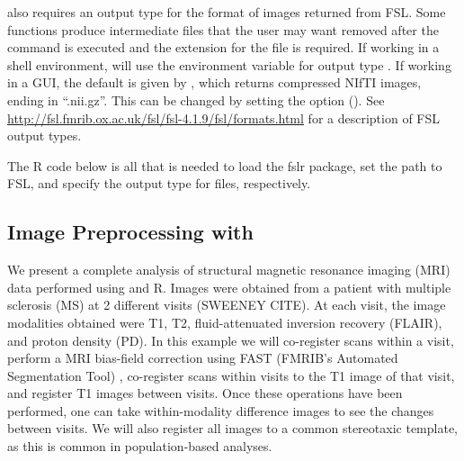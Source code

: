  also requires an output type for the format of images returned from FSL.  Some  functions produce intermediate files that the user may want removed after the command is executed and the extension for the file is required.  If working in a shell environment,  will use the environment variable for output type .  If working in a GUI, the default is given by , which returns compressed NIfTI images, ending in ``.nii.gz''.  This can be changed by setting the  option ().  See \url{http://fsl.fmrib.ox.ac.uk/fsl/fsl-4.1.9/fsl/formats.html} for a description of FSL output types.

The R code below is all that is needed to load the fslr package, set the path to FSL, and specify the output type for files, respectively.
\begin{knitrout}
\color{fgcolor}\begin{kframe}
\begin{alltt}
\hlstd{(}\hlstd{=}\hlstd{)}
\hlstd{(} \hlstd{=} \hlstd{)}
\end{alltt}
\end{kframe}
\end{knitrout}

\subsection{Image Preprocessing with }

We present a complete analysis of structural magnetic resonance imaging (MRI) data performed using  and R.  Images were obtained from a patient with multiple sclerosis (MS) at 2 different visits (SWEENEY CITE).  At each visit, the image modalities obtained were T1, T2, fluid-attenuated inversion recovery (FLAIR), and proton density (PD). In this example we will co-register scans within a visit, perform a MRI bias-field correction using FAST (FMRIB's Automated Segmentation Tool) \citep{zhang_segmentation_2001}, co-register scans within visits to the T1 image of that visit, and register T1 images between visits.  Once these operations have been performed, one can take within-modality difference images to see the changes between visits.  We will also register all images to a common stereotaxic template, as this is common in population-based analyses.

